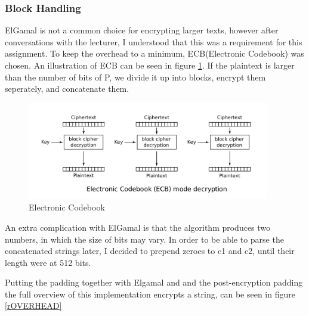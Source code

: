 \documentclass{article}
\begin{document}
\subsubsection{Block Handling}

ElGamal is not a common choice for encrypting larger texts, however after conversations with the lecturer, I understood that this was a requirement for this assignment. To keep the overhead to a minimum, ECB(Electronic Codebook) was chosen. An illustration of ECB can be seen in figure \ref{rECB}. If the plaintext is larger than the number of bits of P, we divide it up into blocks, encrypt them seperately, and concatenate them.
\begin{figure}[H]
 \centering
  \includegraphics[width=300pt]{img/ECB.png}
 \caption{Electronic Codebook\cite{ECB}}
 \label{rECB}
 \end{figure}

An extra complication with ElGamal is that the algorithm produces two numbers, in which the size of bits may vary. In order to be able to parse the concatenated strings later, I decided to prepend zeroes to c1 and c2, until their length were at 512 bits.

Putting the padding together with Elgamal and and the post-encryption padding the full overview of this implementation encrypts a string, can be seen in figure \ref{rOVERHEAD}
\end{document}
